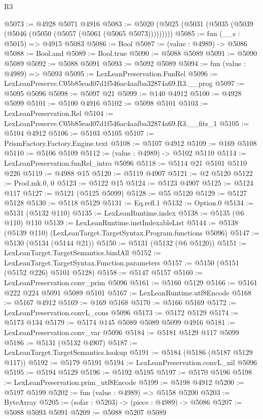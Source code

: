 \begin{lexlean}{R3}
\begin{coremodule}
@5073 := @4928 @5071 @4916
@5083 := @5020 (@5025 (@5031 (@5035 (@5039 (@5046 (@5050 (@5057 (@5061 (@5065 @5073)))))))))
@5085 := fun (__s : @5015) => @4915 @5083
@5086 := Bool
@5087 := (value : @4989) -> @5086
@5088 := Bool.and
@5089 := Bool.true
@5090 := @5088 @5089
@5091 := @5090 @5089
@5092 := @5088 @5091
@5093 := @5092 @5089
@5094 := fun (value : @4989) => @5093
@5095 := LexLeanPreservation.FunRel
@5096 := LexLeanPreserve.C05b85ead07d1f546ac4aafba32874a69.R3.__prog
@5097 := @5095 @5096
@5098 := @5097 @21
@5099 := @140 @4912
@5100 := @4928 @5099
@5101 := @5100 @4916
@5102 := @5098 @5101
@5103 := LexLeanPreservation.Rel
@5104 := LexLeanPreserve.C05b85ead07d1f546ac4aafba32874a69.R3.__fits_1
@5105 := @5104 @4912
@5106 := @5103 @5105
@5107 := PrismFactory.Factory.Engine.text
@5108 := @5107 @4912
@5109 := @169 @5108
@5110 := @5106 @5109
@5112 := (value : @4989) -> @5102 @5110
@5114 := LexLeanPreservation.funRel_intro @5096
@5118 := @5114 @21 @5101 @5110 @226
@5119 := @4988 @15
@5120 := @5119 @4907
@5121 := @2 @5120
@5122 := Prod.mk.{0, 0}
@5123 := @5122 @15
@5124 := @5123 @4907
@5125 := @5124 @117
@5127 := @5121 (@5125 @5099)
@5128 := @55 @5120
@5129 := @5127 @5128
@5130 := @5118 @5129
@5131 := Eq.refl.{1}
@5132 := Option.{0}
@5134 := @5131 (@5132 @110)
@5135 := LexLeanRuntime.index
@5138 := @5135 (@6 @110) @110
@5139 := LexLeanRuntime.instIndexableList
@5144 := @5138 (@5139 @110) (LexLeanTarget.TargetSyntax.Program.functions @5096)
@5147 := @5130 (@5134 (@5144 @21))
@5150 := @5131 (@5132 (@6 @5120))
@5151 := LexLeanTarget.TargetSemantics.bindAll
@5152 := LexLeanTarget.TargetSyntax.Function.parameters
@5157 := @5150 (@5151 (@5152 @226) @5101 @5128)
@5158 := @5147 @5157
@5160 := LexLeanPreservation.conv_prim @5096
@5161 := @5160 @5129
@5166 := @5161 @222 @224 @5091 @5089 @5101
@5167 := LexLeanRuntime.utf8Encode
@5168 := @5167 @4912
@5169 := @169 @5168
@5170 := @5166 @5169
@5172 := LexLeanPreservation.convL_cons @5096
@5173 := @5172 @5129
@5174 := @5173 @134
@5179 := @5174 @145 @5089 @5089 @5099 @4916
@5181 := LexLeanPreservation.conv_var @5096
@5184 := @5181 @5129 @117 @5099
@5186 := @5131 (@5132 @4907)
@5187 := LexLeanTarget.TargetSemantics.lookup
@5191 := @5184 (@5186 (@5187 @5129 @117))
@5192 := @5179 @5191
@5194 := LexLeanPreservation.convL_nil @5096
@5195 := @5194 @5129
@5196 := @5192 @5195
@5197 := @5170 @5196
@5198 := LexLeanPreservation.prim_utf8Encode
@5199 := @5198 @4912
@5200 := @5197 @5199
@5202 := fun (value : @4989) => @5158 @5200
@5203 := ByteArray
@5205 := (sofar : @5203) -> (piece : @4989) -> @5086
@5207 := @5088 @5093 @5091
@5209 := @5088 @5207 @5089

\end{coremodule}
\end{lexlean}
